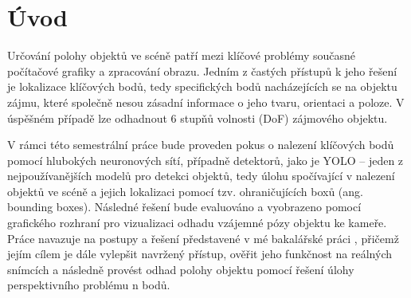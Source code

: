 \chapter{Úvod}
\label{sec:Introduction}
Určování polohy objektů ve scéně patří mezi klíčové problémy současné počítačové grafiky a zpracování obrazu. Jedním z častých přístupů k jeho řešení je lokalizace klíčových bodů, tedy specifických bodů nacházejících se na objektu zájmu, které společně nesou zásadní informace o jeho tvaru, orientaci a poloze. V úspěšném případě lze odhadnout 6 stupňů volnosti (DoF) zájmového objektu.

V rámci této semestrální práce bude proveden pokus o nalezení klíčových bodů pomocí hlubokých neuronových sítí, případně detektorů, jako je YOLO – jeden z nejpoužívanějších modelů pro detekci objektů, tedy úlohu spočívající v nalezení objektů ve scéně a jejich lokalizaci pomocí tzv. ohraničujících boxů (ang. bounding boxes). Následné řešení bude evaluováno a vyobrazeno pomocí grafického rozhraní pro vizualizaci odhadu vzájemné pózy objektu ke kameře. Práce navazuje na postupy a řešení představené v mé bakalářské práci \cite{mojebp}, přičemž jejím cílem je dále vylepšit navržený přístup, ověřit jeho funkčnost na reálných snímcích a následně provést odhad polohy objektu pomocí řešení úlohy perspektivního problému n bodů.